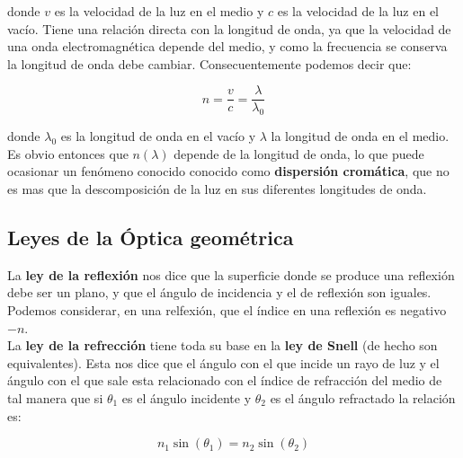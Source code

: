 \documentclass[12pt]{article}
\numberwithin{equation}{section}
\numberwithin{figure}{section}
\begin{document}
donde $v$ es la velocidad de la luz en el medio y $c$ es la velocidad de la luz en el vacío. Tiene una relación directa con la longitud de onda, ya que la velocidad de una onda electromagnética depende del medio, y como la frecuencia se conserva la longitud de onda debe cambiar. Consecuentemente podemos decir que:

\begin{equation}
n = \frac{v}{c} = \frac{\lambda}{\lambda_0}
\end{equation}

donde $\lambda_0$ es la longitud de onda en el vacío y $\lambda$ la longitud de onda en el medio. Es obvio entonces que $n(\lambda)$ depende de la longitud de onda, lo que puede ocasionar un fenómeno conocido conocido como \textbf{dispersión cromática}, que no es mas que la descomposición de la luz en sus diferentes longitudes de onda. 

\subsection{Leyes de la Óptica geométrica}

La \textbf{ley de la reflexión} nos dice que la superficie donde se produce una reflexión debe ser un plano, y que el ángulo de incidencia y el de reflexión son iguales. Podemos considerar, en una relfexión, que el índice en una reflexión es negativo $-n$. \\


La \textbf{ley de la refrección} tiene toda su base en la \textbf{ley de Snell} (de hecho son equivalentes). Esta nos dice que el ángulo con el que incide un rayo de luz y el ángulo con el que sale esta relacionado con el índice de refracción del medio de tal manera que si $\theta_1$ es el ángulo incidente y $\theta_2$ es el ángulo refractado la relación es:

\begin{equation}
n_1 \sin (\theta_1) = n_2 \sin (\theta_2)
\end{equation}
\end{document}
